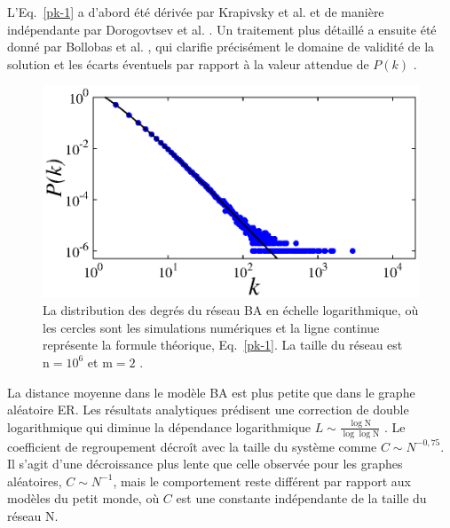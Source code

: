 L'Eq.~\eqref{pk-1} a d'abord été dérivée par Krapivsky et al. \cite{Krapivsky-al2000} et de manière indépendante par Dorogovtsev et al. \cite{Dorogovtsev-al2000-2}. Un traitement plus détaillé a ensuite été donné par Bollobas et al. \cite{Bollobas-Riordan2002}, qui clarifie précisément le domaine de validité de la solution et les écarts éventuels par rapport à la valeur attendue de  $P(k)$ .

\begin{figure}[h!]
	\centering
	\includegraphics[scale=1]{./figures/fig-barabasi}
	\caption{La distribution des degrés du réseau BA en échelle logarithmique, où les cercles sont les simulations numériques et la ligne continue représente la formule théorique, Eq.~\eqref{pk-1}. La taille du réseau est $\mathrm{n}=10^{6}$ et $\mathrm{m}=2$ .}	
	\label{BA-distribution}
\end{figure} 

La distance moyenne dans le modèle BA est plus petite que dans le graphe aléatoire ER. Les résultats analytiques prédisent une correction de double logarithmique qui diminue la dépendance logarithmique $ L\sim\frac{\log \mathrm{N}}{\log\log\mathrm{N} }$ \cite{Bollobas-Riordan2002}. Le coefficient de regroupement décroît avec la taille du système comme $C\sim N^{-0,75}$. Il s'agit d'une décroissance plus lente que celle observée pour les graphes aléatoires, $C\sim N^{-1}$, mais le comportement reste différent par rapport aux modèles du petit monde, où $C$ est une constante indépendante de la taille du réseau $\mathrm{N}$.